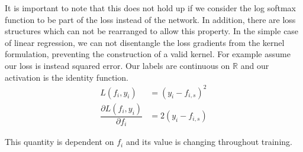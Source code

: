 It is important to note that this does not hold up if we consider the log softmax function to be part of the loss instead of the network.
In addition, there are loss structures which can not be rearranged to allow this property.
In the simple case of linear regression, we can not disentangle the loss gradients from the kernel formulation, preventing the construction of a valid kernel. 
For example assume our loss is instead squared error. Our labels are continuous on $\mathds{R}$ and our activation is the identity function.
\begin{align}
    L(f_i,  y_i) 
    &= (y_i - f_{i, s})^2 \\
    \dfrac{\partial L(f_i,  y_i)}{\partial f_i} &= 2(y_i- f_{i, s})
\end{align}

This quantity is dependent on $f_i$ and its value is changing throughout training. %

